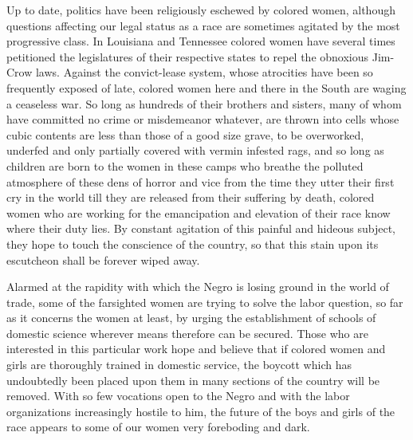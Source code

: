 \documentclass{article}
\begin{document}
Up to date, politics have been religiously eschewed by colored women, although
questions affecting our legal status as a race are sometimes agitated by the
most progressive class. In Louisiana and Tennessee colored women have several
times petitioned the legislatures of their respective states to repel the
obnoxious Jim-Crow laws. Against the convict-lease system, whose atrocities
have been so frequently exposed of late, colored women here and there in the
South are waging a ceaseless war. So long as hundreds of their brothers and
sisters, many of whom have committed no crime or misdemeanor whatever, are
thrown into cells whose cubic contents are less than those of a good size
grave, to be overworked, underfed and only partially covered with vermin
infested rags, and so long as children are born to the women in these camps who
breathe the polluted atmosphere of these dens of horror and vice from the time
they utter their first cry in the world till they are released from their
suffering by death, colored women who are working for the emancipation and
elevation of their race know where their duty lies. By constant agitation of
this painful and hideous subject, they hope to touch the conscience of the
country, so that this stain upon its escutcheon shall be forever wiped away.

Alarmed at the rapidity with which the Negro is losing ground in the world of
trade, some of the farsighted women are trying to solve the labor question, so
far as it concerns the women at least, by urging the establishment of schools
of domestic science wherever means therefore can be secured. Those who are
interested in this particular work hope and believe that if colored women and
girls are thoroughly trained in domestic service, the boycott which has
undoubtedly been placed upon them in many sections of the country will be
removed. With so few vocations open to the Negro and with the labor
organizations increasingly hostile to him, the future of the boys and girls of
the race appears to some of our women very foreboding and dark.
\end{document}
